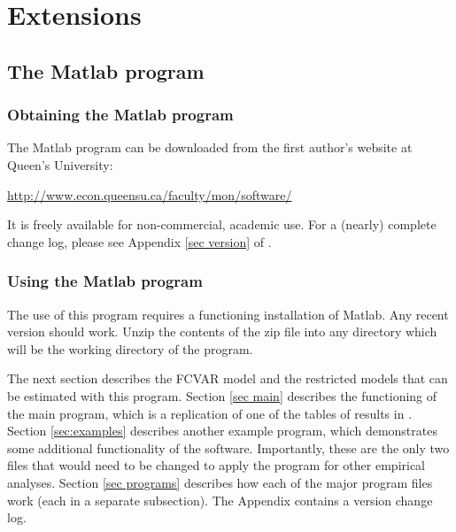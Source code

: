 \documentclass[article]{jss}
\begin{document}


\section{Extensions} \label{sec:extensions}


\subsection{The Matlab program}

\subsubsection{Obtaining the Matlab program}

The Matlab program can be downloaded from the first author's website at Queen's University:

\begin{center} \url{http://www.econ.queensu.ca/faculty/mon/software/}
\end{center}

\noindent It is freely available for non-commercial, academic use. For a (nearly) complete change log, please see Appendix \ref{sec version} of \cite{Nielsen2016}.

\subsubsection{Using the Matlab program}

The use of this program requires a functioning installation of Matlab. Any recent version should work. Unzip the contents of the zip file into any directory which will be the working directory of the program.

The next section describes the FCVAR model and the restricted models that can be estimated with this program. Section \ref{sec main} describes the functioning of the main program, which is a replication of one of the tables of results in \cite{JNP2014}. Section \ref{sec:examples} describes another example program, which demonstrates some additional functionality of the software. Importantly, these are the only two files that would need to be changed to apply the program for other empirical analyses. Section \ref{sec programs} describes how each of the major program files work (each in a separate subsection). The Appendix contains a version change log.
\end{document}
